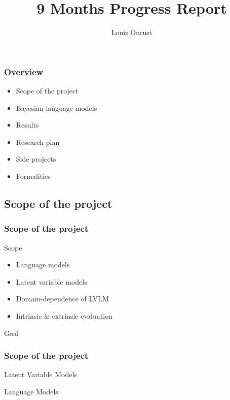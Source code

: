 \documentclass{beamer}
\title{9 Months Progress Report}
\author{Louis Onrust}
\begin{document}
\begin{frame}
    \titlepage
\end{frame}

\begin{frame}
    \frametitle{Overview}

    \begin{itemize}
        \item Scope of the project
        \item Bayesian language models
        \item Results
        \item Research plan
        \item Side projects
        \item Formalities
    \end{itemize}

\end{frame}

\begin{frame}\section{Scope of the project}
    \frametitle{Scope of the project}

    \begin{block}{Scope}
        \begin{itemize}
            \item Language models
            \item Latent variable models
            \item Domain-dependence of LVLM
            \item Intrinsic \& extrinsic evaluation
        \end{itemize}
    \end{block}

    \begin{block}{Goal}
    
    \end{block}
\end{frame}

\begin{frame}
    \frametitle{Scope of the project}

    \begin{block}{Latent Variable Models}
    
    \end{block}

    \begin{block}{Language Models}

    \end{block}
\end{frame}
\end{document}
